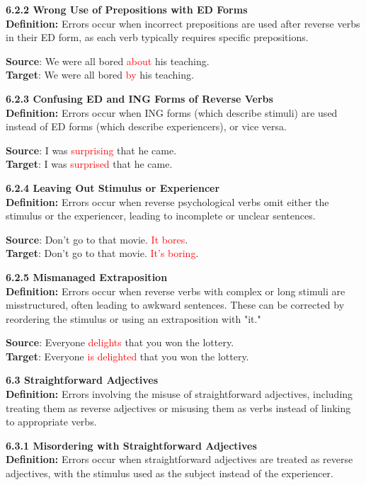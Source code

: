 \begin{tcolorbox}[breakable]
\noindent \textbf{6.2.2 Wrong Use of Prepositions with ED Forms}\\
\textbf{Definition:} Errors occur when incorrect prepositions are used after reverse verbs in their ED form, as each verb typically requires specific prepositions.


\textbf{Source}: We were all bored \textcolor{red}{about} his teaching. \\
\textbf{Target}: We were all bored \textcolor{red}{by} his teaching.


\noindent \textbf{6.2.3 Confusing ED and ING Forms of Reverse Verbs}\\
\textbf{Definition:} Errors occur when ING forms (which describe stimuli) are used instead of ED forms (which describe experiencers), or vice versa.


\textbf{Source}: I was \textcolor{red}{surprising} that he came. \\
\textbf{Target}: I was \textcolor{red}{surprised} that he came.


\noindent \textbf{6.2.4 Leaving Out Stimulus or Experiencer}\\
\textbf{Definition:} Errors occur when reverse psychological verbs omit either the stimulus or the experiencer, leading to incomplete or unclear sentences.


\textbf{Source}: Don’t go to that movie. \textcolor{red}{It bores}. \\
\textbf{Target}: Don’t go to that movie. \textcolor{red}{It's boring}.


\noindent \textbf{6.2.5 Mismanaged Extraposition}\\
\textbf{Definition:} Errors occur when reverse verbs with complex or long stimuli are misstructured, often leading to awkward sentences. These can be corrected by reordering the stimulus or using an extraposition with "it."


\textbf{Source}: Everyone \textcolor{red}{delights} that you won the lottery. \\
\textbf{Target}: Everyone \textcolor{red}{is delighted} that you won the lottery.


\noindent \textbf{6.3 Straightforward Adjectives}\\
\textbf{Definition:} Errors involving the misuse of straightforward adjectives, including treating them as reverse adjectives or misusing them as verbs instead of linking to appropriate verbs.

\noindent \textbf{6.3.1 Misordering with Straightforward Adjectives}\\
\textbf{Definition:} Errors occur when straightforward adjectives are treated as reverse adjectives, with the stimulus used as the subject instead of the experiencer.



\end{tcolorbox}

